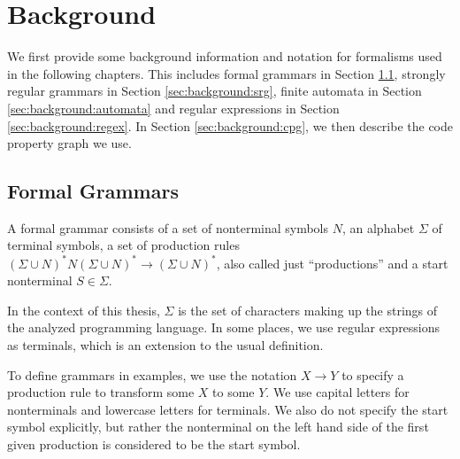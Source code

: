 \chapter{Background}
\label{chapter:Background}
\begin{comment}
What is the knowledge a undergrad student needs so that he/she can understand
your thesis? You can assume some familiarity with the very broad topic. E.g. if
you write a thesis in the area of software analysis, you do not have to explain
static/dynamic analysis as such (this is boring!). If you're a crypto guy, don't
explain AES in detail unless you try to break it in your thesis. If I stumble
across a word/term in your thesis and don't understand it, this is where I would
look it up (or on google).

Probably approx. 3-10 pages
\end{comment}

We first provide some background information and notation for formalisms used in the following chapters. This includes formal grammars in Section \ref{sec:background:grammars}, strongly regular grammars in Section \ref{sec:background:srg}, finite automata in Section \ref{sec:background:automata} and regular expressions in Section \ref{sec:background:regex}. In Section \ref{sec:background:cpg}, we then describe the code property graph we use.

\section{Formal Grammars}\label{sec:background:grammars}

A formal grammar consists of a set of nonterminal symbols $N$, an alphabet $\Sigma$ of terminal symbols, a set of production rules $(\Sigma \cup N)^*N(\Sigma \cup N)^* \rightarrow (\Sigma \cup N)^*$, also called just \enquote{productions} and a start nonterminal $S \in \Sigma$.

In the context of this thesis, $\Sigma$ is the set of characters making up the strings of the analyzed programming language. In some places, we use regular expressions as terminals, which is an extension to the usual definition.

To define grammars in examples, we use the notation $X \rightarrow Y$ to specify a production rule to transform some $X$ to some $Y$.
We use capital letters for nonterminals and lowercase letters for terminals. We also do not specify the start symbol explicitly, but rather the nonterminal on the left hand side of the first given production is considered to be the start symbol.


